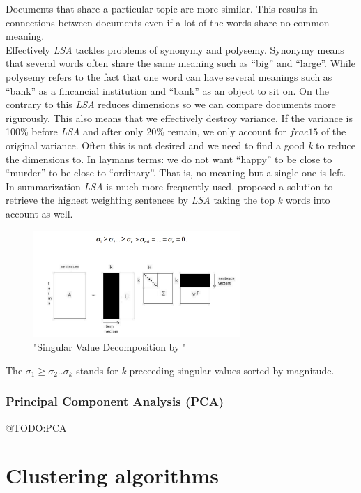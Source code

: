       Documents that share a particular topic are more similar. This results in connections between documents even if a lot of the words share no common meaning.\\
      Effectively \emph{LSA} tackles problems of synonymy and polysemy. Synonymy means that several words often share the same meaning such as ``big'' and ``large''. While polysemy refers to the fact that one word can have several meanings such as ``bank'' as a fincancial institution and ``bank'' as an object to sit on.
      On the contrary to this \emph{LSA} reduces dimensions so we can compare documents more rigurously. This also means that we effectively destroy variance. If the variance is 100\% before \emph{LSA} and after only 20\% remain, we only account for $frac{1}{5}$ of the original variance. Often this is not desired and we need to find a good \emph{k} to reduce the dimensions to. In laymans terms: we do not want ``happy'' to be close to ``murder'' to be close to ``ordinary''. That is, no meaning but a single one is left.
      In summarization \emph{LSA} is much more frequently used. \cite{SumLSASteinberger2004} proposed a solution to retrieve the highest weighting sentences by \emph{LSA} taking the top \emph{k} words into account as well.

      \begin{figure}[h!]
        \centering
          \includegraphics[width=0.7\textwidth]{svd_lsa.png}
          \caption{"Singular Value Decomposition by \cite{SumLSASteinberger2004}"}
          \label{svd_lsa}
      \end{figure}

      The $\sigma_1 \geq \sigma_2..\sigma_k$ stands for \emph{k} preceeding singular values sorted by magnitude.

    \subsubsection{Principal Component Analysis (PCA)}
    @TODO:PCA

\section{Clustering algorithms}
  
